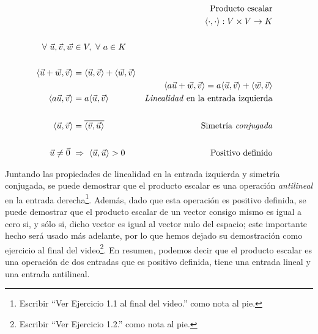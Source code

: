 \documentclass[12pt,dvipsnames]{article}
\numberwithin{equation}{section}
\begin{document}
\begin{align*}
    & &\text{Producto escalar}& &\\
    & &\langle\cdot,\cdot\rangle:V\times V\to K & &\\
    \\
    \forall \ \vec{u}, \vec{v}, \vec{w}&\in V, \ \forall \ a\in K\\
    \\
    \langle\vec{u}+\vec{w},\vec{v}\rangle &= \langle \vec{u} , \vec{v} \rangle + \langle \vec{w} , \vec{v} \rangle \\
                                          & &\langle a\vec{u}+\vec{w} , \vec{v} \rangle = a \langle \vec{u} , \vec{v} \rangle + \langle \vec{w} , \vec{v} \rangle\\
    \langle a\vec{u} , \vec{v} \rangle &= a \langle \vec{u} , \vec{v} \rangle &\text{\emph{Linealidad} en la  entrada izquierda} \\
    \\
    \langle \vec{u} , \vec{v} \rangle &= \overline{ \langle \vec{v} , \vec{u} \rangle} &\text{Simetría \emph{conjugada}}\\
    \\
    \vec{u}\neq\vec{0} \ &\Rightarrow \ \langle \vec{u}, \vec{u} \rangle > 0
 &\text{Positivo definido}
\end{align*}

\noindent Juntando las propiedades de linealidad en la entrada izquierda y simetría conjugada, se puede demostrar que el producto escalar es una operación \emph{antilineal} en la entrada derecha\footnote{Escribir ``Ver Ejercicio 1.1 al final del video.'' como nota al pie.}. Además, dado que esta operación es positivo definida, se puede demostrar que el producto escalar de un vector consigo mismo es igual a cero si, y sólo si, dicho vector es igual al vector nulo del espacio; este importante hecho será usado más adelante, por lo que hemos dejado su demostración como ejercicio al final del video\footnote{Escribir ``Ver Ejercicio 1.2.'' como nota al pie.}. En resumen, podemos decir que el producto escalar es una operación de dos entradas que es positivo definida, tiene una entrada lineal y una entrada antilineal.
\end{document}
